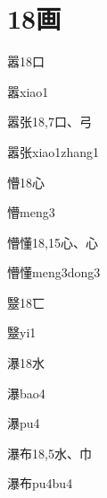 
\section*{18画}

\begin{entry}{嚣}{18}{⼝}
  \begin{phonetics}{嚣}{xiao1}
  \end{phonetics}
\end{entry}

\begin{entry}{嚣张}{18,7}{⼝、⼸}
  \begin{phonetics}{嚣张}{xiao1zhang1}
  \end{phonetics}
\end{entry}

\begin{entry}{懵}{18}{⼼}
  \begin{phonetics}{懵}{meng3}
  \end{phonetics}
\end{entry}

\begin{entry}{懵懂}{18,15}{⼼、⼼}
  \begin{phonetics}{懵懂}{meng3dong3}
  \end{phonetics}
\end{entry}

\begin{entry}{毉}{18}{⼖}
  \begin{phonetics}{毉}{yi1}
  \end{phonetics}
\end{entry}

\begin{entry}{瀑}{18}{⽔}
  \begin{phonetics}{瀑}{bao4}
  \end{phonetics}
  \begin{phonetics}{瀑}{pu4}
  \end{phonetics}
\end{entry}

\begin{entry}{瀑布}{18,5}{⽔、⼱}
  \begin{phonetics}{瀑布}{pu4bu4}
  \end{phonetics}
\end{entry}


